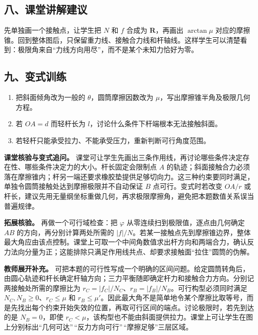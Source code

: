 \documentclass[12pt,a4paper,UTF8]{ctexart}
\newcommand{\tightlist}{\setlength{\itemsep}{0pt}\setlength{\parskip}{0pt}}
\begin{document}
\subsection{八、课堂讲解建议}\label{ux516bux8bfeux5802ux8bb2ux89e3ux5efaux8bae}

先单独画一个接触点，让学生把 \(N\) 和 \(f\) 合成为 \(\bm R\)，再画出
\(\arctan\mu\)
对应的摩擦锥。回到整体图后，只保留重力线、接触合力线和杆轴线。这样学生可以清楚看到：极限角来自``力线方向用尽''，而不是某个未知力恰好为零。

\subsection{九、变式训练}\label{ux4e5dux53d8ux5f0fux8badux7ec3}

\begin{enumerate}
\def\labelenumi{\arabic{enumi}.}
\tightlist
\item
  把斜面倾角改为一般的 \(\theta\)，圆筒摩擦因数改为
  \(\mu\)，写出摩擦锥半角及极限几何方程。
\item
  若 \(OA=d\) 而轻杆长为 \(l\)，讨论什么条件下杆端根本无法接触斜面。
\item
  若轻杆只能承受拉力、不能承受压力，重新判断可行角度范围。
\end{enumerate}

\textbf{课堂核验与变式追问。}
课堂可让学生先画出三条作用线，再讨论哪些条件决定存在性、哪些条件决定力的大小。杆长固定会限制点
\(A\)
的轨迹；斜面接触合力必须落在摩擦锥内；杆另一端还要求橡胶垫提供足够切向力。这三种约束要同时满足，单独令圆筒接触处达到摩擦极限并不自动保证
\(B\) 点可行。变式时若改变 \(OA/r\)
或杆长，建议先用无量纲坐标重做几何，再求极限摩擦角，避免把本题数值关系误当普遍规律。

\textbf{拓展核验。} 再做一个可行域检查：把 \(\varphi\)
从零连续扫到极限值，逐点由几何确定 \(AB\) 的方向，再分别计算两处所需的
\(|f|/N\)。若某一接触点先到摩擦锥边界，整体最大角应由该点控制。课堂上可取一个中间角数值求出杆方向和两端合力，确认反力法向分量为正；这能排除只满足作用线共点、却要求接触面``拉住''圆筒的伪解。

\textbf{教师展开补充。}
可把本题的可行性写成一个明确的区间问题。给定圆筒转角后，由圆心轨迹和杆长确定杆轴方向；三力平衡随即确定杆力和接触合力方向。分别记两接触处所需的摩擦比为
\(r_C=|f_C|/N_C\)、\(r_B=|f_B|/N_B\)。可行构型必须同时满足
\(N_C,N_B\geq0\)、\(r_C\leq\mu\) 和
\(r_B\leq\mu'\)。因此最大角不是简单地令某个摩擦比取等号，而是先找出每个约束开始失效的位置，再取可行区间的端点。讨论极限时，若先到达的是
\(N_B=0\)，即使
\(r_C<\mu\)，该构型也不能由斜面提供拉力。课堂上可让学生在图上分别标出``几何可达''\,``反力方向可行''\,``摩擦足够''三层区域。
\end{document}
